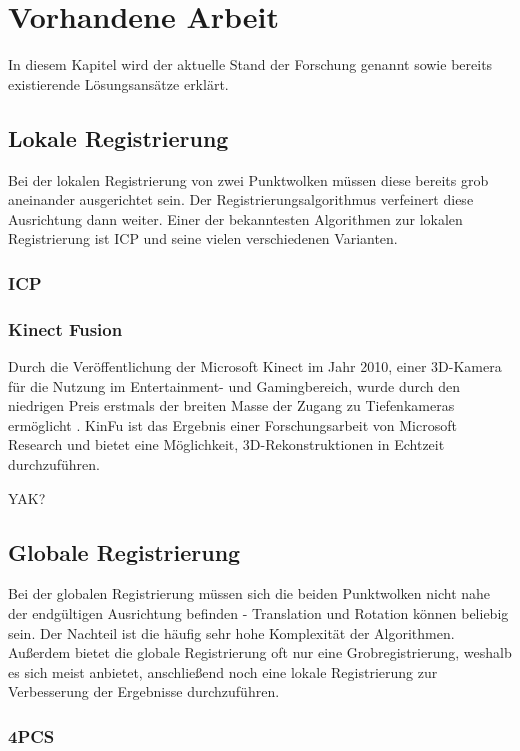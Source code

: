 
\chapter{Vorhandene Arbeit}
\label{ch:vorhandene-arbeit}

In diesem Kapitel wird der aktuelle Stand der Forschung genannt sowie bereits existierende Lösungsansätze erklärt.


\section{Lokale Registrierung}
\label{sec:local-registration}

Bei der lokalen Registrierung von zwei Punktwolken müssen diese bereits grob aneinander ausgerichtet sein.
Der Registrierungsalgorithmus verfeinert diese Ausrichtung dann weiter.
Einer der bekanntesten Algorithmen zur lokalen Registrierung ist \ac{ICP} und seine vielen verschiedenen Varianten.


\subsection{\acl{ICP}}
\label{subsec:icp}

\subsection{Kinect Fusion}
\label{subsec:kinfu}

Durch die Veröffentlichung der Microsoft Kinect im Jahr 2010, einer 3D-Kamera für die Nutzung im Entertainment- und Gamingbereich, wurde durch den niedrigen Preis erstmals der breiten Masse der Zugang zu Tiefenkameras ermöglicht \cite[1:55]{kinfuTalkYoutube}.
\ac{KinFu} ist das Ergebnis einer Forschungsarbeit von Microsoft Research \cite{izadi2011kinectfusion} und bietet eine Möglichkeit, 3D-Rekonstruktionen in Echtzeit durchzuführen.

YAK? \cite{klingensmith2015chisel}


\section{Globale Registrierung}
\label{sec:global-registration}

Bei der globalen Registrierung müssen sich die beiden Punktwolken nicht nahe der endgültigen Ausrichtung befinden - Translation und Rotation können beliebig sein.
Der Nachteil ist die häufig sehr hohe Komplexität der Algorithmen.
Außerdem bietet die globale Registrierung oft nur eine Grobregistrierung, weshalb es sich meist anbietet, anschließend noch eine lokale Registrierung zur Verbesserung der Ergebnisse durchzuführen.


\subsection{\acl{4PCS}}
\label{subsec:4pcs}

